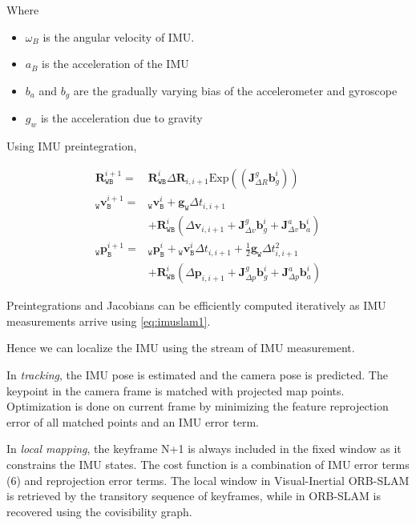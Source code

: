 Where
\begin{itemize}
	\item ${\omega }_{B}$ is the angular velocity of IMU.
	\item ${a}_{B}$ is the acceleration of the IMU
	\item $b_a$ and $b_g$ are the gradually varying bias of the accelerometer and gyroscope
	\item $g_w$ is the acceleration due to gravity
\end{itemize}

Using IMU preintegration, 

\begin{align} \label{eq:imuslam1} \mathbf {R}^{i+1}_\mathtt {WB} = & \mathbf {R}^{i}_\mathtt {WB} \Delta \mathbf {R}_{i,i+1} \text{Exp}\left(\left(\mathbf {J}^g_{\Delta R}\mathbf {b}^i_g\right)\right) \nonumber\\ _\mathtt {W}\mathbf {v}^{i+1}_\mathtt {B} = & {_\mathtt {W}\mathbf {v}^{i}_\mathtt {B}} + \mathbf {g}_\mathtt {W} \Delta t_{i,i+1} \nonumber\\ &+ \mathbf {R}^{i}_\mathtt {WB} \left(\Delta \mathbf {v}_{i,i+1} + \mathbf {J}^g_{\Delta v} \mathbf {b}^i_g + \mathbf {J}^a_{\Delta v} \mathbf {b}^i_a\right) \nonumber\\ _\mathtt {W}\mathbf {p}^{i+1}_\mathtt {B} = & {_\mathtt {W}\mathbf {p}^{i}_\mathtt {B}} + {_\mathtt {W}\mathbf {v}^{i}_\mathtt {B}} \Delta t_{i,i+1} + \frac{1}{2}\mathbf {g}_\mathtt {W} \Delta t^2_{i,i+1} \nonumber\\ & + \mathbf {R}^{i}_\mathtt {WB} \left(\Delta \mathbf {p}_{i,i+1} + \mathbf {J}^g_{\Delta p} \mathbf {b}^i_g + \mathbf {J}^a_{\Delta p} \mathbf {b}^i_a\right) \end{align}

Preintegrations and Jacobians can be efficiently computed iteratively as IMU measurements arrive using \ref{eq:imuslam1}.

Hence we can localize the IMU using the stream of IMU measurement.

In \textit{tracking}, the IMU pose is estimated and the camera pose is predicted. The keypoint in the camera frame is matched with projected map points. Optimization is done on current frame by minimizing the feature reprojection error of all matched points and an IMU error term. 

In \textit{local mapping}, the keyframe N+1 is always included in the fixed window as it constrains the IMU states. The cost function is a combination of IMU error terms (6) and reprojection error terms. The local window in Visual-Inertial ORB-SLAM is retrieved by the transitory sequence of keyframes, while in ORB-SLAM is recovered using the covisibility graph.

